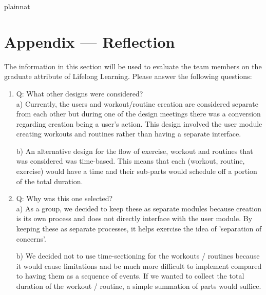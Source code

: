 \documentclass[12pt, titlepage]{article}
\begin{document}

 {plainnat}


\newpage{}
\section*{Appendix --- Reflection}

The information in this section will be used to evaluate the team members on the
graduate attribute of Lifelong Learning.  Please answer the following questions:

\begin{enumerate}
  \item Q: What other designs were considered? \\
  a) Currently, the users and workout/routine creation are considered separate from each other but during one of the design meetings there was a conversion regarding creation being a user's action. This design involved the user module creating workouts and routines rather than having a separate interface.
  
  b) An alternative design for the flow of exercise, workout and routines that was considered was time-based. This means that each (workout, routine, exercise) would have a time and their sub-parts would schedule off a portion of the total duration.
  \item Q: Why was this one selected? \\ 
  a) As a group, we decided to keep these as separate modules because creation is its own process and does not directly interface with the user module. By keeping these as separate processes, it helps exercise the idea of 'separation of concerns'.
  
  b) We decided not to use time-sectioning for the workouts / routines because it would cause limitations and be much more difficult to implement compared to having them as a sequence of events. If we wanted to collect the total duration of the workout / routine, a simple summation of parts would suffice.
\end{enumerate}
\end{document}
